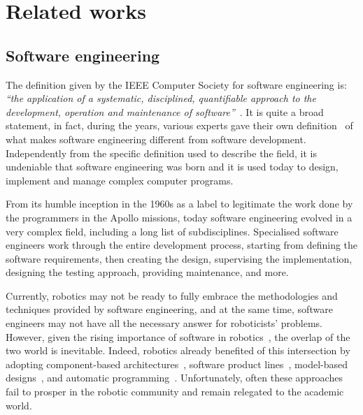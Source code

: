 \chapter[Related works]{Related works}\label{ch:Related}

\section{Software engineering}
The definition given by the IEEE Computer Society for software engineering is: \textit{``the application of a systematic, disciplined, quantifiable approach to the development, operation and maintenance of software''}~\cite{abran2004software}. It is quite a broad statement, in fact, during the years, various experts gave their own definition~\cite{sommerville2011software, ieee1990ieee, pressman2005software} of what makes software engineering different from software development. Independently from the specific definition used to describe the field, it is undeniable that software engineering was born and it is used today to design, implement and manage complex computer programs.

From its humble inception in the 1960s as a label to legitimate the work done by the programmers in the Apollo missions, today software engineering evolved in a very complex field, including a long list of subdisciplines. Specialised software engineers work through the entire development process, starting from defining the software requirements, then creating the design, supervising the implementation, designing the testing approach, providing maintenance, and more.

Currently, robotics may not be ready to fully embrace the methodologies and techniques provided by software engineering, and at the same time, software engineers may not have all the necessary answer for roboticists' problems. However, given the rising importance of software in robotics~\cite{cousins2011exponential}, the overlap of the two world is inevitable. Indeed, robotics already benefited of this intersection by adopting component-based architectures~\cite{quigley2009ros, schlegel2014smartmdsd}, software product lines~\cite{gherardi2014modeling}, model-based designs~\cite{diego2010v3cmm}, and automatic programming~\cite{kumar2016rosmod}. Unfortunately, often these approaches fail to prosper in the robotic community and remain relegated to the academic world.

